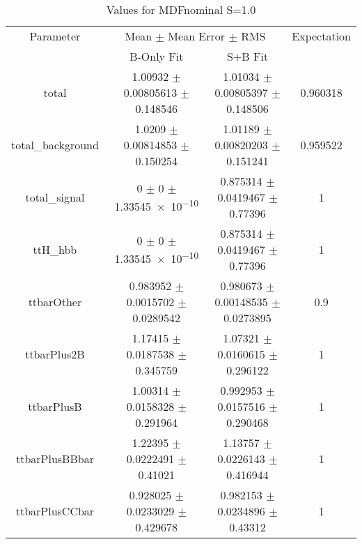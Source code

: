 \begin{table}
\centering
\caption{Values for MDFnominal S=1.0}
\begin{tabular}{cccc}
\toprule
Parameter & \multicolumn{2}{c}{Mean $\pm$ Mean Error $\pm$ RMS} & Expectation\\
 & B-Only Fit & S+B Fit & \\
\midrule
total & \num{1.00932} $\pm$ \num{0.00805613} $\pm$ \num{0.148546} & \num{1.01034} $\pm$ \num{0.00805397} $\pm$ \num{0.148506} & \num{0.960318}\\
total\_background & \num{1.0209} $\pm$ \num{0.00814853} $\pm$ \num{0.150254} & \num{1.01189} $\pm$ \num{0.00820203} $\pm$ \num{0.151241} & \num{0.959522}\\
total\_signal & \num{0} $\pm$ \num{0} $\pm$ \num{1.33545e-10} & \num{0.875314} $\pm$ \num{0.0419467} $\pm$ \num{0.77396} & \num{1}\\
ttH\_hbb & \num{0} $\pm$ \num{0} $\pm$ \num{1.33545e-10} & \num{0.875314} $\pm$ \num{0.0419467} $\pm$ \num{0.77396} & \num{1}\\
ttbarOther & \num{0.983952} $\pm$ \num{0.0015702} $\pm$ \num{0.0289542} & \num{0.980673} $\pm$ \num{0.00148535} $\pm$ \num{0.0273895} & \num{0.9}\\
ttbarPlus2B & \num{1.17415} $\pm$ \num{0.0187538} $\pm$ \num{0.345759} & \num{1.07321} $\pm$ \num{0.0160615} $\pm$ \num{0.296122} & \num{1}\\
ttbarPlusB & \num{1.00314} $\pm$ \num{0.0158328} $\pm$ \num{0.291964} & \num{0.992953} $\pm$ \num{0.0157516} $\pm$ \num{0.290468} & \num{1}\\
ttbarPlusBBbar & \num{1.22395} $\pm$ \num{0.0222491} $\pm$ \num{0.41021} & \num{1.13757} $\pm$ \num{0.0226143} $\pm$ \num{0.416944} & \num{1}\\
ttbarPlusCCbar & \num{0.928025} $\pm$ \num{0.0233029} $\pm$ \num{0.429678} & \num{0.982153} $\pm$ \num{0.0234896} $\pm$ \num{0.43312} & \num{1}\\
\bottomrule
\end{tabular}
\end{table}